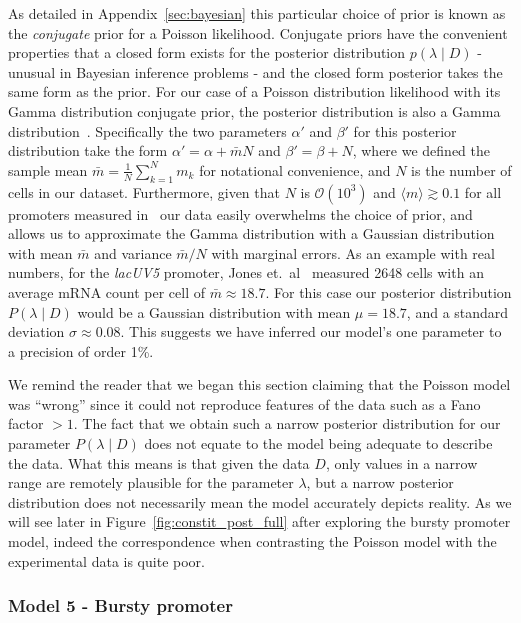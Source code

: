 As detailed in Appendix~\ref{sec:bayesian} this particular choice of prior is
known as the \textit{conjugate} prior for a Poisson likelihood.
Conjugate priors have the convenient properties that a closed form exists for the posterior distribution $p(\lambda \mid D)$ - unusual in Bayesian inference problems - and the closed form posterior takes the same form as the prior. For
our case of a Poisson distribution likelihood with its
Gamma distribution conjugate prior, the posterior distribution is also a Gamma
distribution~\cite{Gelman2013}. Specifically the two parameters $\alpha'$ and
$\beta'$ for this posterior distribution take the form $\alpha' = \alpha +
\bar{m} N$ and $\beta' = \beta + N$, where we defined the sample mean $\bar{m} =
\frac{1}{N}\sum_{k=1}^N m_k$ for notational convenience, and $N$ is the number
of cells in our dataset. Furthermore, given that $N$ is $\mathcal{O}(10^3)$ and
$\langle m\rangle \gtrsim 0.1$ for all promoters measured in~\cite{Jones2014}
our data easily overwhelms the choice of prior, and allows us to approximate the
Gamma distribution with a Gaussian distribution with mean $\bar{m}$ and variance
$\bar{m} / N$ with marginal errors. As an example with real numbers, for the
\textit{lacUV5} promoter, Jones et.\ al~\cite{Jones2014} measured 2648 cells
with an average mRNA count per cell of $\bar{m} \approx 18.7$. For this case our
posterior distribution $P(\lambda \mid D)$ would be a Gaussian distribution with
mean $\mu = 18.7$, and a standard deviation $\sigma \approx 0.08$. This suggests
we have inferred our model's one parameter to a precision of order 1\%.

We remind the reader that we began this section claiming that the Poisson model
was ``wrong'' since it could not reproduce features of the data such as a Fano
factor $> 1$. The fact that we obtain such a narrow posterior distribution for our
parameter $P(\lambda \mid D)$ does not equate to the model being adequate to
describe the data. What this means is that given the data $D$, only values
in a narrow range are remotely plausible for the parameter $\lambda$,
but a narrow posterior distribution does not necessarily
mean the model accurately depicts reality.
As we will see later in Figure~\ref{fig:constit_post_full} after
exploring the bursty promoter model, indeed the correspondence
when contrasting the Poisson model with the experimental data is quite poor.

\subsubsection{Model 5 - Bursty promoter}

